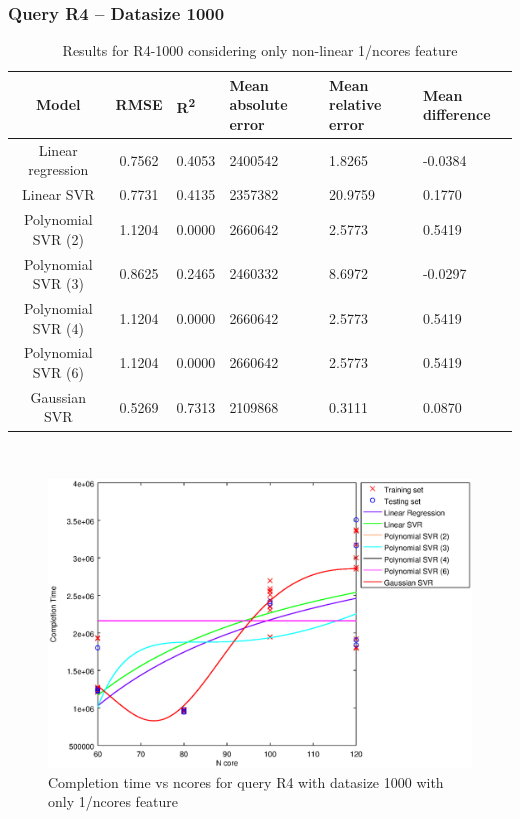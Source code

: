 \documentclass[a4paper,11pt]{article}
\begin{document}
\newpage
\subsubsection{Query R4 -- Datasize 1000}

\begin{table}[H]
	\centering
	\begin{adjustbox}{center}
		\begin{tabular}{c | c M{1.2cm} M{2.5cm} M{2.5cm} M{1.8cm}}
			Model & RMSE & R\textsuperscript{2} & Mean absolute error & Mean relative error & Mean difference \tabularnewline
			\hline
			Linear regression & 0.7562 & 0.4053 & 2400542 & 1.8265 & -0.0384 \\
			Linear SVR & 0.7731 & 0.4135 & 2357382 & 20.9759 & 0.1770 \\
			Polynomial SVR (2) & 1.1204 & 0.0000 & 2660642 & 2.5773 & 0.5419 \\
			Polynomial SVR (3) & 0.8625 & 0.2465 & 2460332 & 8.6972 & -0.0297 \\
			Polynomial SVR (4) & 1.1204 & 0.0000 & 2660642 & 2.5773 & 0.5419 \\
			Polynomial SVR (6) & 1.1204 & 0.0000 & 2660642 & 2.5773 & 0.5419 \\
			Gaussian SVR & 0.5269 & 0.7313 & 2109868 & 0.3111 & 0.0870 \\
		\end{tabular}
	\end{adjustbox}
	\\
	\caption{Results for R4-1000 considering only non-linear 1/ncores feature}
	\label{table_R4_prediction_all}
\end{table}

\begin {figure}[hbtp]
\centering
\includegraphics[width=\textwidth]{output/R4_1000_ONLY_1_OVER_NCORES/plot_R4_1000.eps}
\caption {Completion time vs ncores for query R4 with datasize 1000 with only 1/ncores feature}
\end {figure}
\end{document}
